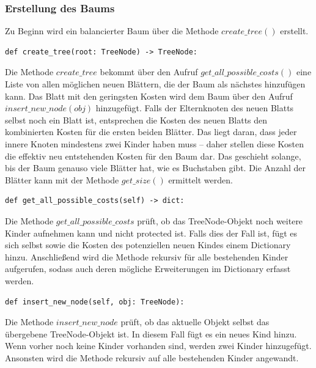 \documentclass[a4paper,12pt,ngerman]{scrartcl}
\begin{document}
\subsubsection{Erstellung des Baums}
Zu Beginn wird ein balancierter Baum über die Methode $create\_tree()$ erstellt.
\vspace{2em}
\begin{lstlisting}[caption={\texttt{create\_tree}}, label={lst:create_tree}]
  def create_tree(root: TreeNode) -> TreeNode:
\end{lstlisting}
Die Methode $create\_tree$ bekommt über den Aufruf $get\_all\_possible\_costs()$ eine Liste von allen möglichen neuen Blättern, die der Baum als nächstes hinzufügen kann.
Das Blatt mit den geringsten Kosten wird dem Baum über den Aufruf $insert\_new\_node(obj)$ hinzugefügt.
Falls der Elternknoten des neuen Blatts selbst noch ein Blatt ist, entsprechen die Kosten des neuen Blatts den kombinierten Kosten für die ersten beiden Blätter.
Das liegt daran, dass jeder innere Knoten mindestens zwei Kinder haben muss – daher stellen diese Kosten die effektiv neu entstehenden Kosten für den Baum dar.
Das geschieht solange, bis der Baum genauso viele Blätter hat, wie es Buchstaben gibt. Die Anzahl der Blätter kann mit der Methode $get\_size()$ ermittelt werden.\\
\begin{lstlisting}[caption={\texttt{get\_all\_possible\_costs}}, label={lst:get_all_pssible_costs}]
  def get_all_possible_costs(self) -> dict:
\end{lstlisting}
Die Methode $get\_all\_possible\_costs$ prüft, ob das TreeNode-Objekt noch weitere Kinder aufnehmen kann und nicht protected ist.
Falls dies der Fall ist, fügt es sich selbst sowie die Kosten des potenziellen neuen Kindes einem Dictionary hinzu.
Anschließend wird die Methode rekursiv für alle bestehenden Kinder aufgerufen, sodass auch deren mögliche Erweiterungen im Dictionary erfasst werden.\\
\vspace{1em} 
\begin{lstlisting}[caption={\texttt{insert\_new\_node}}, label={lst:insert_new_node}]
  def insert_new_node(self, obj: TreeNode):
\end{lstlisting}
Die Methode $insert\_new\_node$ prüft, ob das aktuelle Objekt selbst das übergebene TreeNode-Objekt ist. 
In diesem Fall fügt es ein neues Kind hinzu. 
Wenn vorher noch keine Kinder vorhanden sind, werden zwei Kinder hinzugefügt.
Ansonsten wird die Methode rekursiv auf alle bestehenden Kinder angewandt.\\
\end{document}
